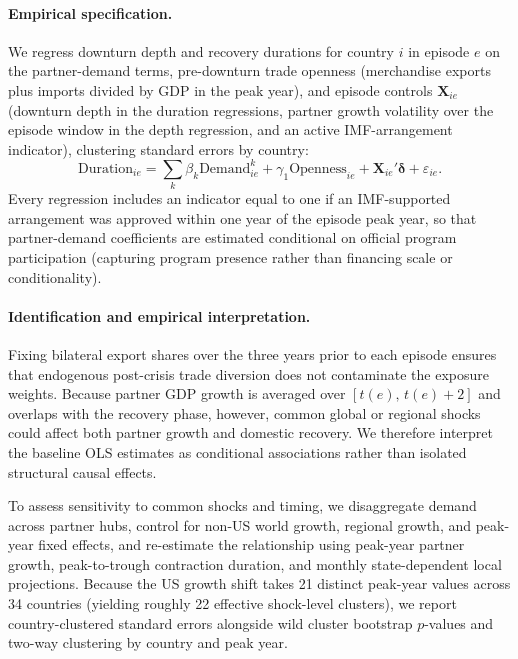 \documentclass[12pt, a4paper]{article}
\begin{document}
\paragraph{Empirical specification.} We regress downturn depth and recovery durations for country $i$ in episode $e$ on the partner-demand terms, pre-downturn trade openness (merchandise exports plus imports divided by GDP in the peak year), and episode controls $\mathbf{X}_{ie}$ (downturn depth in the duration regressions, partner growth volatility over the episode window in the depth regression, and an active IMF-arrangement indicator), clustering standard errors by country:
\begin{equation}
\text{Duration}_{ie} = \sum_{k} \beta_k \text{Demand}_{ie}^k + \gamma_1 \text{Openness}_{ie} + \mathbf{X}_{ie}'\boldsymbol{\delta} + \varepsilon_{ie}.
\label{eq:main_spec}
\end{equation}
Every regression includes an indicator equal to one if an IMF-supported arrangement was approved within one year of the episode peak year, so that partner-demand coefficients are estimated conditional on official program participation (capturing program presence rather than financing scale or conditionality).

\paragraph{Identification and empirical interpretation.} Fixing bilateral export shares over the three years prior to each episode ensures that endogenous post-crisis trade diversion does not contaminate the exposure weights. Because partner GDP growth is averaged over $[t(e),\, t(e)+2]$ and overlaps with the recovery phase, however, common global or regional shocks could affect both partner growth and domestic recovery. We therefore interpret the baseline OLS estimates as conditional associations rather than isolated structural causal effects.

To assess sensitivity to common shocks and timing, we disaggregate demand across partner hubs, control for non-US world growth, regional growth, and peak-year fixed effects, and re-estimate the relationship using peak-year partner growth, peak-to-trough contraction duration, and monthly state-dependent local projections. Because the US growth shift takes 21 distinct peak-year values across 34 countries (yielding roughly 22 effective shock-level clusters), we report country-clustered standard errors alongside wild cluster bootstrap $p$-values and two-way clustering by country and peak year.
\end{document}
